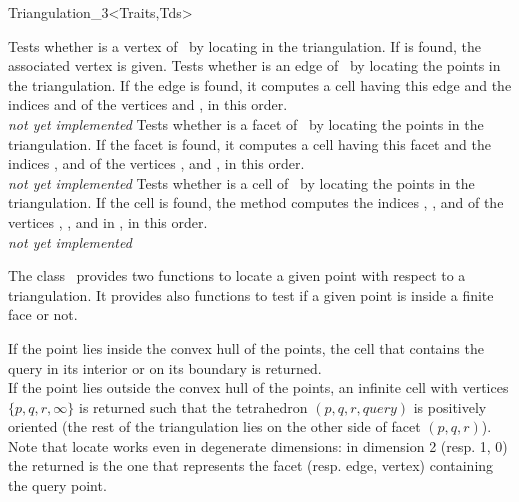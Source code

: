 \begin{ccClassTemplate}{Triangulation_3<Traits,Tds>}

{Tests whether  is a vertex of \ccVar\ by locating  in
the triangulation. If  is found, the associated vertex 
is given.}
\ccGlue
{}
{Tests whether  is an edge of \ccVar\ by locating the points 
in the triangulation. If the edge is found,
it computes a cell  having this edge and the indices 
and  of the vertices  and , in this order.  
\\
\textit{not yet implemented}}
\ccGlue
{}
{Tests whether  is a facet of \ccVar\ by locating the points 
in the triangulation. If the facet is found,
it computes a cell  having this facet and the indices ,
 and  of the vertices ,  and , in
this order.  
\\
\textit{not yet implemented}}
\ccGlue
{}
{Tests whether  is a cell of \ccVar\ by locating the points 
in the triangulation. If the cell  is found, the method
computes the indices , ,  and  of the
vertices , ,  and  in , in this
order. 
\\
\textit{not yet implemented}}


The class \ccClassTemplateName\  provides two functions to locate
a given point with respect to a triangulation. It provides
also functions to test if a given point is inside a finite face
or not.

{
If the point  lies inside the convex hull of the points, the cell 
that contains the query in its interior or on its boundary is returned.\\
If the point  lies outside the convex hull of the points,
an infinite cell with vertices $\{ p, q, r, \infty\}$ is returned such that
the tetrahedron $( p, q, r, query )$ is positively oriented
(the rest of the triangulation lies on the other side of facet 
$( p, q, r )$). \\
Note that locate works even in degenerate dimensions: in dimension 2
(resp. 1, 0) the  returned is the one that represents
the facet (resp. edge, vertex) containing the query point.
}


\end{ccClassTemplate}

